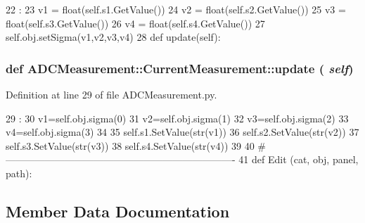 \begin{DoxyCode}
22                             :
23         v1 = float(self.s1.GetValue())
24         v2 = float(self.s2.GetValue())
25         v3 = float(self.s3.GetValue())
26         v4 = float(self.s4.GetValue())
27         self.obj.setSigma(v1,v2,v3,v4)
28 
    def update(self):
\end{DoxyCode}
\hypertarget{classADCMeasurement_1_1CurrentMeasurement_a5a8dbc0c17e6a530458fd18b142416eb}{
\subsubsection[{update}]{\setlength{\rightskip}{0pt plus 5cm}def ADCMeasurement::CurrentMeasurement::update ( {\em self})}}
\label{classADCMeasurement_1_1CurrentMeasurement_a5a8dbc0c17e6a530458fd18b142416eb}


Definition at line 29 of file ADCMeasurement.py.


\begin{DoxyCode}
29                     :
30         v1=self.obj.sigma(0)
31         v2=self.obj.sigma(1)
32         v3=self.obj.sigma(2)
33         v4=self.obj.sigma(3)
34 
35         self.s1.SetValue(str(v1))
36         self.s2.SetValue(str(v2))
37         self.s3.SetValue(str(v3))
38         self.s4.SetValue(str(v4))        
39 
40 #----------------------------------------------------------------------
41 
def Edit (cat, obj, panel, path):
\end{DoxyCode}


\subsection{Member Data Documentation}
\hypertarget{classADCMeasurement_1_1CurrentMeasurement_a4700a5576f637753ef795fbd5418a532}{
\subsubsection[{s1}]{}}
\label{classADCMeasurement_1_1CurrentMeasurement_a4700a5576f637753ef795fbd5418a532}


